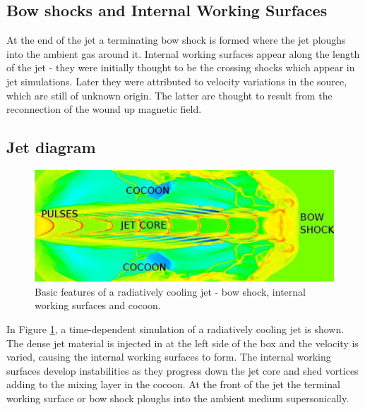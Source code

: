 \subsection{Bow shocks and Internal Working Surfaces}
At the end of the jet a terminating bow shock is formed where the jet ploughs into the ambient gas around it. 
Internal working surfaces appear along the length of the jet - they were
initially thought to be the crossing shocks which appear in jet simulations.
Later they were attributed to velocity variations in the source, which are still
of unknown origin. The latter are thought to result from the reconnection of the
wound up magnetic field. %




\subsection{Jet diagram}


\begin{figure}[t]
\centering
\includegraphics[width=\textwidth]{jet_diagram}
\caption{
Basic features of a radiatively cooling jet - bow shock, internal working surfaces and cocoon.
}
\label{fig:JetDiagram} %
\end{figure}

In Figure \ref{fig:JetDiagram}, a time-dependent simulation of a radiatively cooling jet is shown.
The dense jet material is injected in at the left side of the box and the velocity is varied, causing the internal working surfaces to form. The internal working surfaces develop instabilities as they progress down the jet core and shed vortices adding to the mixing layer in the cocoon. At the front of the jet the terminal working surface or bow shock ploughs into the ambient medium supersonically. 

